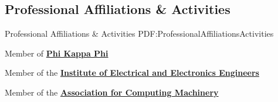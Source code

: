 \documentclass[letterpaper,MMMyyyy,nonstop]{simpleresumecv}
\begin{document}
\begin{body}

\section
{Professional Affiliations\newline
\& Activities}
{Professional Affiliations \& Activities}
{PDF:ProfessionalAffiliationsActivities}

Member of 
\href{https://www.phikappaphi.org/}
{\textbf{Phi Kappa Phi}}

Member of the
\href{http://www.ieee.org}
{\textbf{Institute of Electrical and Electronics Engineers}}

Member of the
\href{http://www.acm.org}
{\textbf{Association for Computing Machinery}}


\iffalse

\section
{Campus Activities}
{Campus Activities}
{PDF:CampusActivities}

\href{http://groups.engr.oregonstate.edu/ieee-new}
{\textbf{IEEE @ OSU}},
Oregon State University

\GapNoBreak
\BulletItem
Web Administrator
\hfill
\DatestampYMD{2015}{11}{05} --
\DatestampYMD{2016}{06}{10}
\begin{detail}
\SubBulletItem
Maintained and wrote web articles \& pages for the IEEE presence at Oregon State University; Worked to revitalize campus presence before merging with the Robotics Club.
\end{detail}

\href{http://osurobotics.club}
{\textbf{OSU Robotics Club}},
Oregon State University

\GapNoBreak
\BulletItem
Rover Team, Electrical Sub-team member
\hfill
\DatestampYMD{2015}{9}{29} --
Present
\begin{detail}
\SubBulletItem
Helped with small subprojects regarding the Mars Rover Robot as a member of the Electrical sub-team.
\end{detail}

\fi



\end{body}
\end{document}
